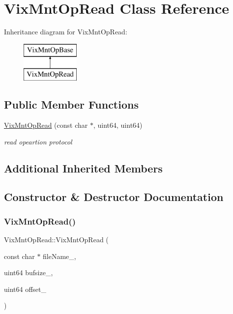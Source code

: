 \hypertarget{class_vix_mnt_op_read}{}\section{Vix\+Mnt\+Op\+Read Class Reference}
\label{class_vix_mnt_op_read}
Inheritance diagram for Vix\+Mnt\+Op\+Read\+:\begin{figure}[H]
\begin{center}
\leavevmode
\includegraphics[height=2.000000cm]{class_vix_mnt_op_read}
\end{center}
\end{figure}
\subsection*{Public Member Functions}
\begin{DoxyCompactItemize}
\item 
\hyperlink{class_vix_mnt_op_read_a1914bcb825479576f7031636177da577}{Vix\+Mnt\+Op\+Read} (const char $\ast$, uint64, uint64)
\begin{DoxyCompactList}\small\item\em read opeartion protocol \end{DoxyCompactList}\end{DoxyCompactItemize}
\subsection*{Additional Inherited Members}


\subsection{Constructor \& Destructor Documentation}
\hypertarget{class_vix_mnt_op_read_a1914bcb825479576f7031636177da577}{}\label{class_vix_mnt_op_read_a1914bcb825479576f7031636177da577} 
\subsubsection{\texorpdfstring{Vix\+Mnt\+Op\+Read()}{VixMntOpRead()}}
{\ttfamily Vix\+Mnt\+Op\+Read\+::\+Vix\+Mnt\+Op\+Read (\begin{DoxyParamCaption}\item[{const char $\ast$}]{file\+Name\+\_\+,  }\item[{uint64}]{bufsize\+\_\+,  }\item[{uint64}]{offset\+\_\+ }\end{DoxyParamCaption})\hspace{0.3cm}{\ttfamily [explicit]}}



